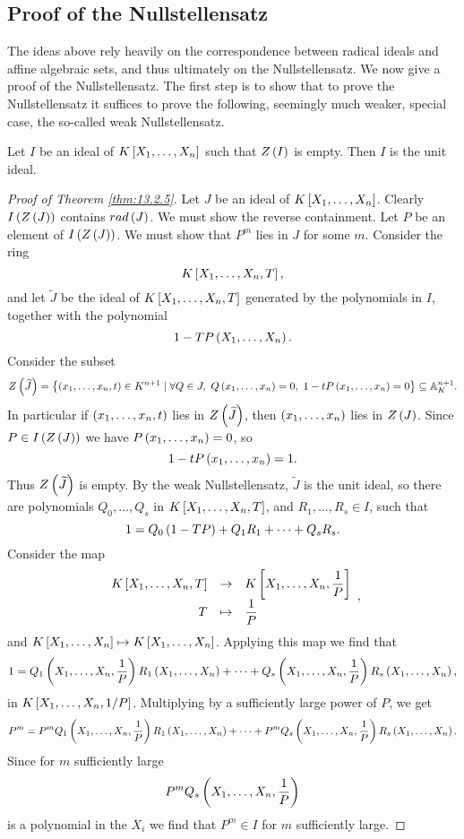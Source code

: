 \subsection{Proof of the Nullstellensatz}

The ideas above rely heavily on the correspondence between radical ideals and affine algebraic sets, and thus ultimately on the Nullstellensatz. We now give a proof of the Nullstellensatz. The first step is to show that to prove the Nullstellensatz it suffices to prove the following, seemingly much weaker, special case, the so-called weak Nullstellensatz.

\begin{theorem}
\label{thm:13.3.1}
Let $ I $ be an ideal of $ K\sb{X_1, \dots, X_n} $ such that $ Z\rb{I} $ is empty. Then $ I $ is the unit ideal.
\end{theorem}

\begin{proof}[Proof of Theorem \ref{thm:13.2.5}]
Let $ J $ be an ideal of $ K\sb{X_1, \dots, X_n} $. Clearly $ I\rb{Z\rb{J}} $ contains $ rad\rb{J} $. We must show the reverse containment. Let $ P $ be an element of $ I\rb{Z\rb{J}} $. We must show that $ P^m $ lies in $ J $ for some $ m $. Consider the ring
$$ K\sb{X_1, \dots, X_n, T}, $$
and let $ \widetilde{J} $ be the ideal of $ K\sb{X_1, \dots, X_n, T} $ generated by the polynomials in $ I $, together with the polynomial
$$ 1 - TP\rb{X_1, \dots, X_n}. $$
Consider the subset
$$ Z\rb{\widetilde{J}} = \cb{\rb{x_1, \dots, x_n, t} \in K^{n + 1} \mid \forall Q \in J, \ Q\rb{x_1, \dots, x_n} = 0, \ 1 - tP\rb{x_1, \dots, x_n} = 0} \subseteq \A_K^{n + 1}. $$
In particular if $ \rb{x_1, \dots, x_n, t} $ lies in $ Z\rb{\widetilde{J}} $, then $ \rb{x_1, \dots, x_n} $ lies in $ Z\rb{J} $. Since $ P \in I\rb{Z\rb{J}} $ we have $ P\rb{x_1, \dots, x_n} = 0 $, so
$$ 1 - tP\rb{x_1, \dots, x_n} = 1. $$
Thus $ Z\rb{\widetilde{J}} $ is empty. By the weak Nullstellensatz, $ \widetilde{J} $ is the unit ideal, so there are polynomials $ Q_0, \dots, Q_s $ in $ K\sb{X_1, \dots, X_n, T} $, and $ R_1, \dots, R_s \in I $, such that
$$ 1 = Q_0\rb{1 - TP} + Q_1R_1 + \dots + Q_sR_s. $$
Consider the map
$$ \function{K\sb{X_1, \dots, X_n, T}}{K\sb{X_1, \dots, X_n, \dfrac{1}{P}}}{T}{\dfrac{1}{P}}, $$
and $ K\sb{X_1, \dots, X_n} \mapsto K\sb{X_1, \dots, X_n} $. Applying this map we find that
$$ 1 = Q_1\rb{X_1, \dots, X_n, \dfrac{1}{P}}R_1\rb{X_1, \dots, X_n} + \dots + Q_s\rb{X_1, \dots, X_n, \dfrac{1}{P}}R_s\rb{X_1, \dots, X_n}, $$
in $ K\sb{X_1, \dots, X_n, 1 / P} $. Multiplying by a sufficiently large power of $ P $, we get
$$ P^m = P^mQ_1\rb{X_1, \dots, X_n, \dfrac{1}{P}}R_1\rb{X_1, \dots, X_n} + \dots + P^mQ_s\rb{X_1, \dots, X_n, \dfrac{1}{P}}R_s\rb{X_1, \dots, X_n}. $$
Since for $ m $ sufficiently large
$$ P^mQ_s\rb{X_1, \dots, X_n, \dfrac{1}{P}} $$
is a polynomial in the $ X_i $ we find that $ P^m \in I $ for $ m $ sufficiently large.
\end{proof}

